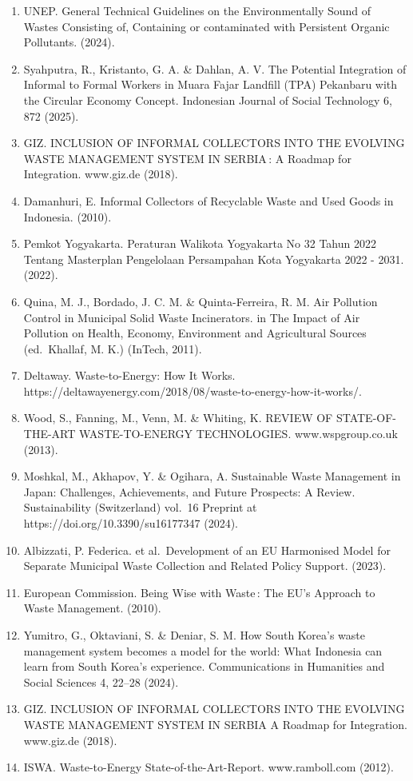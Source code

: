 \documentclass[
  letterpaper,
  DIV=11,
  numbers=noendperiod]{scrreprt}
\begin{document}
\begin{enumerate}
  Wahyono, S. et al.~Identification and analysis of municipal solid
  waste pre-treatment to improve waste quality for waste-to-energy
  facility. in IOP Conference Series: Earth and Environmental Science
  vol.~1201 (Institute of Physics, 2023).
\item
  UNEP. General Technical Guidelines on the Environmentally Sound of
  Wastes Consisting of, Containing or contaminated with Persistent
  Organic Pollutants. (2024).
\item
  Syahputra, R., Kristanto, G. A. \& Dahlan, A. V. The Potential
  Integration of Informal to Formal Workers in Muara Fajar Landfill
  (TPA) Pekanbaru with the Circular Economy Concept. Indonesian Journal
  of Social Technology 6, 872 (2025).
\item
  GIZ. INCLUSION OF INFORMAL COLLECTORS INTO THE EVOLVING WASTE
  MANAGEMENT SYSTEM IN SERBIA\,: A Roadmap for Integration. www.giz.de
  (2018).
\item
  Damanhuri, E. Informal Collectors of Recyclable Waste and Used Goods
  in Indonesia. (2010).
\item
  Pemkot Yogyakarta. Peraturan Walikota Yogyakarta No 32 Tahun 2022
  Tentang Masterplan Pengelolaan Persampahan Kota Yogyakarta 2022 -
  2031. (2022).
\item
  Quina, M. J., Bordado, J. C. M. \& Quinta-Ferreira, R. M. Air
  Pollution Control in Municipal Solid Waste Incinerators. in The Impact
  of Air Pollution on Health, Economy, Environment and Agricultural
  Sources (ed.~Khallaf, M. K.) (InTech, 2011).
\item
  Deltaway. Waste-to-Energy: How It Works.
  https://deltawayenergy.com/2018/08/waste-to-energy-how-it-works/.
\item
  Wood, S., Fanning, M., Venn, M. \& Whiting, K. REVIEW OF
  STATE-OF-THE-ART WASTE-TO-ENERGY TECHNOLOGIES. www.wspgroup.co.uk
  (2013).
\item
  Moshkal, M., Akhapov, Y. \& Ogihara, A. Sustainable Waste Management
  in Japan: Challenges, Achievements, and Future Prospects: A Review.
  Sustainability (Switzerland) vol.~16 Preprint at
  https://doi.org/10.3390/su16177347 (2024).
\item
  Albizzati, P. Federica. et al.~Development of an EU Harmonised Model
  for Separate Municipal Waste Collection and Related Policy Support.
  (2023).
\item
  European Commission. Being Wise with Waste\,: The EU's Approach to
  Waste Management. (2010).
\item
  Yumitro, G., Oktaviani, S. \& Deniar, S. M. How South Korea's waste
  management system becomes a model for the world: What Indonesia can
  learn from South Korea's experience. Communications in Humanities and
  Social Sciences 4, 22--28 (2024).
\item
  GIZ. INCLUSION OF INFORMAL COLLECTORS INTO THE EVOLVING WASTE
  MANAGEMENT SYSTEM IN SERBIA A Roadmap for Integration. www.giz.de
  (2018).
\item
  ISWA. Waste-to-Energy State-of-the-Art-Report. www.ramboll.com (2012).
\end{enumerate}
\end{document}
